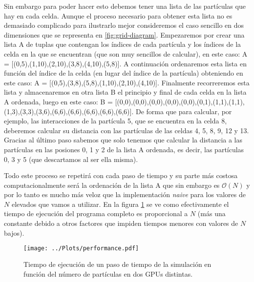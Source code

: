 Sin embargo para poder hacer esto debemos tener una lista de las partículas que hay en cada celda. Aunque el proceso necesario para obtener esta lista no es demasiado complicado para ilustrarlo mejor consideremos el caso sencillo en dos dimensiones que se representa en \ref{fig:grid-diagram}. Empezaremos por crear una lista A de tuplas que contengan los índices de cada partícula y los índices de la celda en la que se encuentran (que son muy sencillos de calcular), en este caso: A = [(0,5),(1,10),(2,10),(3,8),(4,10),(5,8)]. A continuación ordenaremos esta lista en función del índice de la celda (en lugar del índice de la partícula) obteniendo en este caso: A = [(0,5),(3,8),(5,8),(1,10),(2,10),(4,10)]. Finalmente recorreremos esta lista y almacenaremos en otra lista B el principio y final de cada celda en la lista A ordenada, luego en este caso: B = [(0,0),(0,0),(0,0),(0,0),(0,0),(0,1),(1,1),(1,1),(1,3),(3,3),(3,6),(6,6),(6,6),(6,6),(6,6),(6,6)]. De forma que para calcular, por ejemplo, las interacciones de la partícula 5, que se encuentra en la celda 8, deberemos calcular su distancia con las partículas de las celdas 4, 5, 8, 9, 12 y 13. Gracias al último paso sabemos que solo tenemos que calcular la distancia a las partículas en las posiones 0, 1 y 2 de la lista A ordenada, es decir, las partículas 0, 3 y 5 (que descartamos al ser ella misma).

Todo este proceso se repetirá con cada paso de tiempo y su parte más costosa computacionalmente será la ordenación de la lista A que sin embargo es $\mathcal{O}(N)$ y por lo tanto es mucho más veloz que la implementación \textit{naive} para los valores de $N$ elevados que vamos a utilizar. En la figura \ref{fig:performance} se ve como efectivamente el tiempo de ejecución del programa completo es proporcional a $N$ (más una constante debido a otros factores que impiden tiempos menores con valores de $N$ bajos).

\begin{figure}
    \centering
    \texttt{[image: ../Plots/performance.pdf]}
    \caption{Tiempo de ejecución de un paso de tiempo de la simulación en función del número de partículas en dos GPUs distintas.}
    \label{fig:performance}
\end{figure}
